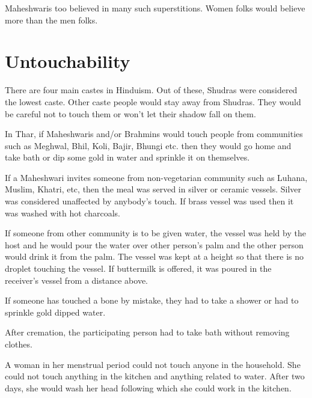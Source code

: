 Maheshwaris too believed in many such superstitions. Women folks would believe
more than the men folks.

\section{Untouchability}
There are four main castes in Hinduism. Out of these,
Shudras were considered the lowest caste. Other caste people would stay away
from Shudras. They would be careful not to touch them or won't let their shadow
fall on them. 

In Thar, if Maheshwaris and/or Brahmins would touch people from communities
such as Meghwal, Bhil, Koli, Bajir, Bhungi etc. then they would go home and
take bath or dip some gold in water and sprinkle it on themselves. 

If a Maheshwari invites someone from non-vegetarian community such as Luhana,
Muslim, Khatri, etc, then the meal was served in silver or ceramic vessels.
Silver was considered unaffected by anybody's touch. If brass vessel was used
then it was washed with hot charcoals.

If someone from other community is to be given water, the vessel was held by
the host and he would pour the water over other person's palm and the other
person would drink it from the palm. The vessel was kept at a height so that
there is no droplet touching the vessel. If buttermilk is offered, it was
poured in the receiver's vessel from a distance above.

If someone has touched a bone by mistake, they had to take a shower or had to
sprinkle gold dipped water.

After cremation, the participating person had to take bath without removing
clothes.

A woman in her menstrual period could not touch anyone in the household. She
could not touch anything in the kitchen and anything related to water. After
two days, she would wash her head following which she could work in the
kitchen.

